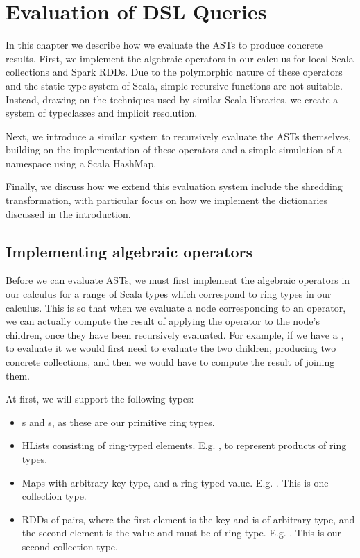 \chapter{Evaluation of DSL Queries} \label{evaluation}

In this chapter we describe how we evaluate the ASTs to produce concrete results. First, we implement the algebraic operators in our calculus for local Scala collections and Spark RDDs. Due to the polymorphic nature of these operators and the static type system of Scala, simple recursive functions are not suitable. Instead, drawing on the techniques used by similar Scala libraries, we create a system of typeclasses and implicit resolution.

Next, we introduce a similar system to recursively evaluate the ASTs themselves, building on the implementation of these operators and a simple simulation of a namespace using a Scala HashMap. 

Finally, we discuss how we extend this evaluation system include the shredding transformation, with particular focus on how we implement the dictionaries discussed in the introduction.

\section{Implementing algebraic operators}

Before we can evaluate ASTs, we must first implement the algebraic operators in our calculus for a range of Scala types which correspond to ring types in our calculus. This is so that when we evaluate a node corresponding to an operator, we can actually compute the result of applying the operator to the node's children, once they have been recursively evaluated. For example, if we have a , to evaluate it we would first need to evaluate the two children, producing two concrete collections, and then we would have to compute the result of joining them.

At first, we will support the following types:
\begin{itemize}
\item{s and s, as these are our primitive ring types.}
\item{HLists consisting of ring-typed elements. E.g. , to represent products of ring types.} 
\item{Maps with arbitrary key type, and a ring-typed value.
E.g. . This is one collection type.}
\item{RDDs of pairs, where the first element is the key and is of arbitrary type, and the second element is the value and must be of ring type. E.g. \lin{RDD[(String,Int::Boolean::HNil)}. This is our second collection type.}
\end{itemize}

